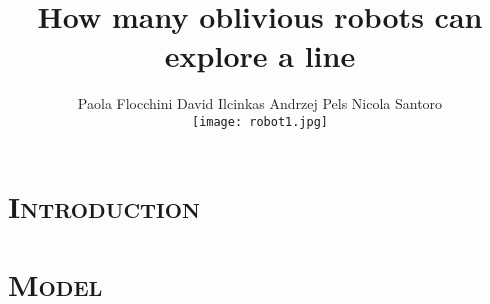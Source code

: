 \documentclass[xcolor=x11names,compress]{beamer}
\renewcommand{\(}{\begin{columns}}
\renewcommand{\)}{\end{columns}}
\newcommand{\<}[1]{\begin{column}{#1}}
\renewcommand{\>}{\end{column}}
\begin{document}
\section{\scshape Introduction}
\begin{frame}
\title{How many oblivious robots can explore a line}
\author{
	Paola Flocchini  David Ilcinkas  Andrzej Pels  Nicola Santoro\\
	\vspace{24pt} 
	\texttt{[image: robot1.jpg]}
}
\titlepage
\end{frame}


\section{\scshape Model}
\end{document}
